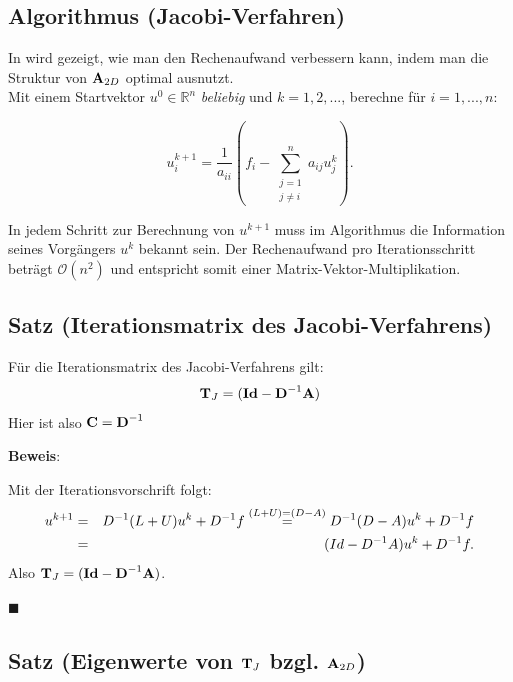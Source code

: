 \subsection{Algorithmus (Jacobi-Verfahren)}\label{ss.Allgemeines Jacobi-Verfahren}

In \cite{ALO2} wird gezeigt, wie man den Rechenaufwand verbessern kann, indem man die Struktur von ${\textbf{A}}_{2D}$ optimal ausnutzt.\\
Mit einem Startvektor $u^{0} \in \mathbb{R}^{n}$ \textit{beliebig} und $k=1,2,...$, berechne für $i=1,...,n$:

\begin{equation}
u^{k+1}_{i} = \frac {1} {a_{ii}} (f_{i} - \sum_{\substack{j = 1 \\ j \ne i}}^{n} a_{ij}u^{k}_{j}).
\end{equation}

In jedem Schritt zur Berechnung von $u^{k+1}$ muss im Algorithmus die Information seines Vorgängers $u^{k}$ bekannt sein. Der Rechenaufwand pro Iterationsschritt beträgt $\mathcal{O}(n^{2})$ und entspricht somit einer Matrix-Vektor-Multiplikation.

\subsection{Satz (Iterationsmatrix des Jacobi-Verfahrens)}\label{ss.Iterationsmatrix Jacobi}

Für die Iterationsmatrix des Jacobi-Verfahrens gilt:
\begin{equation}
{\textbf{T}}_{J} = ({\textbf{Id}} - {\textbf{D}}^{-1} {\textbf{A}})
\end{equation}
Hier ist also ${\textbf{C}} = {\textbf{D}}^{-1}$

\textbf{Beweis}:

Mit der Iterationsvorschrift folgt:
\begin{eqnarray}
u^{k+1} &=& D^{-1}(L+U)u^{k} + D^{-1}f \overset{(L+U)=(D-A)}{=} D^{-1}(D-A)u^{k}+D^{-1}f \notag \\
&=& (Id-D^{-1}A)u^{k} + D^{-1}f. \notag
\end{eqnarray}
Also ${\textbf{T}}_{J} = ({\textbf{Id}} - {\textbf{D}}^{-1} {\textbf{A}})$.
\begin{flushright}
$\blacksquare$
\end{flushright}

\subsection{Satz (Eigenwerte von ${\textbf{T}}_{J}$ bzgl. ${\textbf{A}}_{2D}$)}\label{ss.EW Jacobi}

